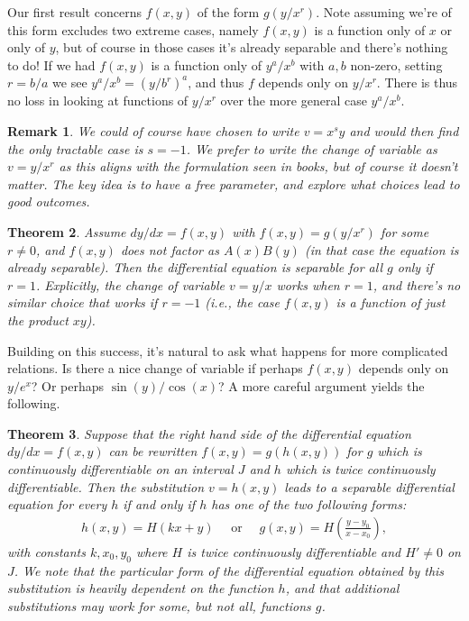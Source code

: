 \documentclass[12pt,reqno]{amsart}
\theoremstyle{plain}
\numberwithin{equation}{section} %
\newtheorem{thm}{Theorem}[section] %
\newtheorem{rek}[thm]{Remark}
\numberwithin{table}{section} %
\numberwithin{figure}{section}
\begin{document}
Our first result concerns $f(x,y)$ of the form $g(y/x^r)$. Note assuming we're of this form excludes two extreme cases, namely $f(x,y)$ is a function only of $x$ or only of $y$, but of course in those cases it's already separable and there's nothing to do! If we had $f(x,y)$ is a function only of $y^a/x^b$ with $a, b$ non-zero, setting $r = b/a$ we see $y^a/x^b = (y/b^r)^a$, and thus $f$ depends only on $y/x^r$. There is thus no loss in looking at functions of $y/x^r$ over the more general case $y^a/x^b$.


\begin{rek} We could of course have chosen to write $v = x^s y$ and would then find the only tractable case is $s = -1$. We prefer to write the change of variable as $v = y/x^r$ as this aligns with the formulation seen in books, but of course it doesn't matter. The key idea is to have a free parameter, and explore what choices lead to good outcomes. \end{rek}

\begin{thm}\label{thm:mainxyr} Assume $dy/dx = f(x,y)$ with $f(x,y) = g(y/x^r)$ for some $r \neq 0$, and $f(x,y)$ does not factor as $A(x) B(y)$ (in that case the equation is already separable). Then the differential equation is separable for all $g$ only if $r=1$. Explicitly, the change of variable $v = y/x$ works when $r=1$, and there's no similar choice that works if $r=-1$ (i.e., the case $f(x,y)$ is a function of just the product $xy$).
\end{thm}

Building on this success, it's natural to ask what happens for more complicated relations. Is there a nice change of variable if perhaps $f(x,y)$ depends only on $y/e^x$? Or perhaps $\sin(y)/\cos(x)$? A more careful argument yields the following.

\begin{thm}\label{thm:maingeneralcase}
Suppose that the right hand side of the differential equation $dy/dx = f(x,y)$ can be rewritten $f(x,y) = g(h(x,y))$ for $g$ which is continuously differentiable on an interval $J$ and $h$ which is twice continuously differentiable. Then the substitution $v =h(x,y)$ leads to a separable differential equation for every $h$ if and only if $h$ has one of the two following forms:
\begin{align}
    h(x,y) = H(kx+y)\quad \text{ or }\quad g(x,y) = H\left(\frac{y-y_0}{x-x_0}\right),
\end{align}
with constants $k,x_0,y_0$ where $H$ is twice continuously differentiable and $H'\neq 0$ on $J$. We note that the particular form of the differential equation obtained by this substitution is heavily dependent on the function $h$, and that additional substitutions may work for some, but not all, functions $g$.
\end{thm}
\end{document}
